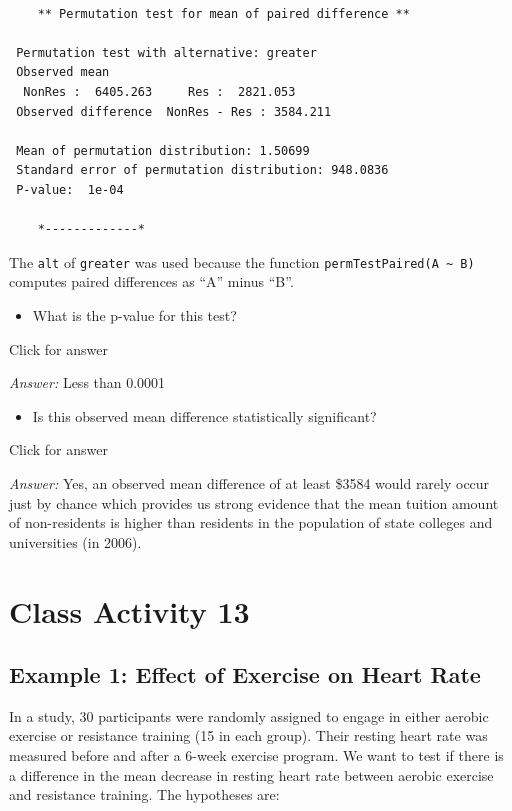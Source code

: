 \documentclass[
]{book}
\providecommand{\tightlist}{%
  \setlength{\itemsep}{0pt}\setlength{\parskip}{0pt}}
\begin{document}
\begin{verbatim}

    ** Permutation test for mean of paired difference **

 Permutation test with alternative: greater 
 Observed mean
  NonRes :  6405.263     Res :  2821.053 
 Observed difference  NonRes - Res : 3584.211 

 Mean of permutation distribution: 1.50699 
 Standard error of permutation distribution: 948.0836 
 P-value:  1e-04 

    *-------------*
\end{verbatim}

The \texttt{alt} of \texttt{greater} was used because the function \texttt{permTestPaired(A\ \textasciitilde{}\ B)} computes paired differences as ``A'' minus ``B''.

\begin{itemize}
\tightlist
\item
  What is the p-value for this test?
\end{itemize}

Click for answer

\emph{Answer:} Less than 0.0001

\begin{itemize}
\tightlist
\item
  Is this observed mean difference statistically significant?
\end{itemize}

Click for answer

\emph{Answer:} Yes, an observed mean difference of at least \$3584 would rarely occur just by chance which provides us strong evidence that the mean tuition amount of non-residents is higher than residents in the population of state colleges and universities (in 2006).

\hypertarget{class-activity-13}{%
\chapter{Class Activity 13}\label{class-activity-13}}

\hypertarget{example-1-effect-of-exercise-on-heart-rate}{%
\section{Example 1: Effect of Exercise on Heart Rate}\label{example-1-effect-of-exercise-on-heart-rate}}

In a study, 30 participants were randomly assigned to engage in either aerobic exercise or resistance training (15 in each group). Their resting heart rate was measured before and after a 6-week exercise program. We want to test if there is a difference in the mean decrease in resting heart rate between aerobic exercise and resistance training. The hypotheses are:
\end{document}
